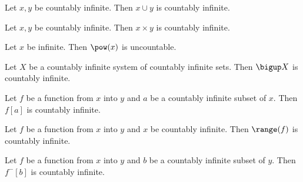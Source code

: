 \documentclass[../../basic-notions.ftl.tex]{subfiles}
\begin{document}
\begin{forthel}
    \begin{proposition}[7247472361472000]
      Let $x,y$ be countably infinite.
      Then $x \cup y$ is countably infinite.
    \end{proposition}

    \begin{proposition}[1613072347168768]
      Let $x,y$ be countably infinite.
      Then $x \times y$ is countably infinite.
    \end{proposition}

    \begin{proposition}[Cantor]
      Let $x$ be infinite.
      Then $\pow(x)$ is uncountable.
    \end{proposition}

    \begin{proposition}[6578041140543488]
      Let $X$ be a countably infinite system of countably infinite sets.
      Then $\bigup X$ is countably infinite.
    \end{proposition}

    \begin{proposition}[8660803444015104]
      Let $f$ be a function from $x$ into $y$ and $a$ be a countably infinite subset of $x$.
      Then $f[a]$ is countably infinite.
    \end{proposition}

    \begin{corollary}[2307651954278400]
      Let $f$ be a function from $x$ into $y$ and $x$ be countably infinite.
      Then $\range(f)$ is countably infinite.
    \end{corollary}

    \begin{proposition}[5577541272207360]
      Let $f$ be a function from $x$ into $y$ and $b$ be a countably infinite subset of $y$.
      Then $f^{-}[b]$ is countably infinite.
    \end{proposition}
  \end{forthel}
\end{document}
